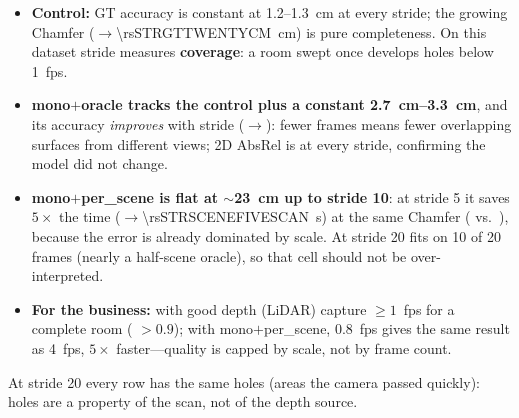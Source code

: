 \begin{itemize}
\item \textbf{Control:} GT accuracy is constant at 1.2--\SI{1.3}{cm} at every stride; the growing Chamfer
(\rsSTRGTONECM$\rightarrow$\SI{\rsSTRGTTWENTYCM}{cm}) is pure completeness. On this dataset stride measures \textbf{coverage}: a room swept once
develops holes below 1~fps.
\item \textbf{mono$+$oracle tracks the control plus a constant \SIrange{2.7}{3.3}{cm}}, and its accuracy
\emph{improves} with stride (\rsSTRORACLEONEACC$\rightarrow$\rsSTRORACLETWENTYACC): fewer frames means fewer
overlapping surfaces from different views; 2D AbsRel is \rsSTRORACLEONEABSREL{} at every stride, confirming the model
did not change.
\item \textbf{mono$+$per\_scene is flat at $\sim$\SI{23}{cm} up to stride 10}: at stride 5 it saves $5\times$ the time
(\rsSTRSCENEONESCAN$\rightarrow$\SI{\rsSTRSCENEFIVESCAN}{s}) at the same Chamfer (\rsSTRSCENEONECM{} vs.\
\rsSTRSCENEFIVECM), because the error is already dominated by scale. At stride 20
\code{per\_scene} fits on 10 of 20 frames (nearly a half-scene oracle), so that cell should not be over-interpreted.
\item \textbf{For the business:} with good depth (LiDAR) capture $\geq 1$~fps for a complete room (\fscore{} $>0.9$);
with mono$+$per\_scene, 0.8~fps gives the same result as 4~fps, $5\times$ faster---quality is capped by scale, not by
frame count.
\end{itemize}
At stride 20 every row has the same holes (areas the camera passed quickly): holes are a property of the scan, not of
the depth source.

